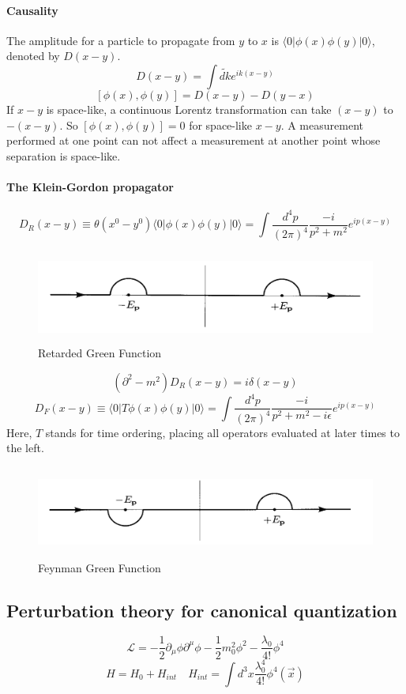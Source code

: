 \documentclass{article}
\begin{document}
\paragraph{Causality}
The amplitude for a particle to propagate from $y$ to $x$ is $\langle 0 | \phi(x) \phi(y) | 0 \rangle$, denoted by $D(x-y)$.
\[D(x-y) = \int \widetilde{dk} e^{ik(x-y)}\]
\[[\phi(x),\phi(y)] = D(x-y) -D(y-x)\]
If $x-y$ is space-like, a continuous Lorentz transformation can take $(x-y)$ to $-(x-y)$. So $[\phi(x),\phi(y)] =0$ for space-like $x-y$. A measurement performed at one point can not affect a measurement at another point whose separation is space-like.
\paragraph{The Klein-Gordon propagator}
\[D_R(x-y) \equiv \theta(x^0-y^0) \langle 0 | \phi(x) \phi(y) | 0 \rangle = \int \frac{d^4 p}{(2\pi)^4} \frac{-i}{p^2+m^2} e^{ip(x-y)}\]
\begin{figure}[!h]
\centering
\includegraphics[height=3cm ,width=14cm]{./pic/R_Green.png}
\caption{Retarded Green Function}
\end{figure}
\[(\partial^2-m^2) D_R(x-y) = i \delta(x-y)\]
\[D_F(x-y) \equiv \langle 0 | T\phi(x) \phi(y) | 0 \rangle = \int \frac{d^4 p}{(2\pi)^4} \frac{-i}{p^2+m^2-i\epsilon} e^{ip(x-y)}\]
Here, $T$ stands for time ordering, placing all operators evaluated at later times to the left.
\begin{figure}[!h]
\centering
\includegraphics[height=3cm ,width=14cm]{./pic/F_Green.png}
\caption{Feynman Green Function}
\end{figure}

\subsection{Perturbation theory for canonical quantization}
\[\mathcal{L} = -\frac{1}{2}\partial_{\mu} \phi \partial^{\mu} \phi -\frac{1}{2}m_0^2 \phi^2 -\frac{\lambda_0}{4!}\phi^4\]
\[H = H_0 + H_{int} \quad H_{int} = \int d^3 x \frac{\lambda_0^4}{4!} \phi^4 (\vec{x})\]
\end{document}
